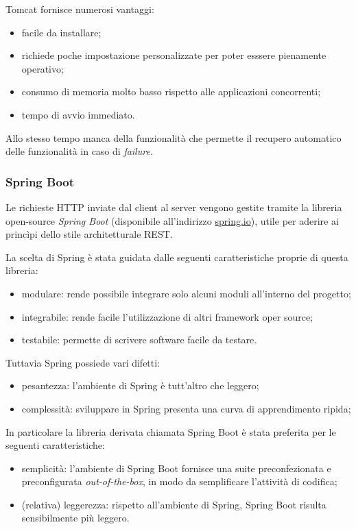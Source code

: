 Tomcat fornisce numerosi vantaggi:
\begin{itemize}
	\item facile da installare;
	\item richiede poche impostazione personalizzate per poter esssere pienamente operativo;
	\item consumo di memoria molto basso rispetto alle applicazioni concorrenti;
	\item tempo di avvio immediato. 
\end{itemize}

Allo stesso tempo manca della funzionalità che permette il recupero automatico delle funzionalità in caso di \emph{failure}.

\subsubsection{Spring Boot}
Le richieste HTTP inviate dal client al server vengono gestite tramite la libreria open-source \emph{Spring Boot} (disponibile all'indirizzo \url{spring.io}), utile per aderire ai princìpi dello stile architetturale REST.

La scelta di Spring è stata guidata dalle seguenti caratteristiche proprie di questa libreria:
\begin{itemize}
	\item modulare: rende possibile integrare solo alcuni moduli all'interno del progetto;
	\item integrabile: rende facile l'utilizzazione di altri framework oper source;
	\item testabile: permette di scrivere software facile da testare.
\end{itemize}

Tuttavia Spring possiede vari difetti:
\begin{itemize}
	\item pesantezza: l'ambiente di Spring è tutt'altro che leggero;
	\item complessità: sviluppare in Spring presenta una curva di apprendimento ripida;
\end{itemize}

In particolare la libreria derivata chiamata Spring Boot è stata preferita per le seguenti caratteristiche:
\begin{itemize}
	\item semplicità: l'ambiente di Spring Boot fornisce una suite preconfezionata e preconfigurata \emph{out-of-the-box}, in modo da semplificare l'attività di codifica;
	\item (relativa) leggerezza: rispetto all'ambiente di Spring, Spring Boot risulta sensibilmente più leggero.
\end{itemize}

